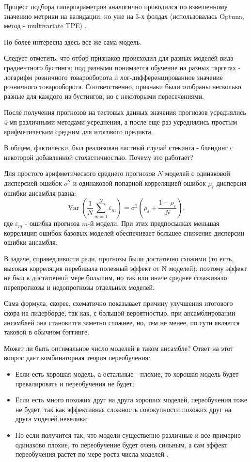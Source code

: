 \documentclass[12pt, a4paper]{article}
\begin{document}
Процесс подбора гиперпараметров аналогично проводился по взвешенному значению метрики на валидации,
но уже на 3-х фолдах (использовалась Optuna, метод - multivariate TPE) \cite{akiba2019, bergstra2011}.

Но более интересна здесь все же сама модель.

Следует отметить, что отбор признаков происходил для разных моделей вида градиентного бустинга;
под разными понимается обучение на разных таргетах - логарифм розничного товарооборота и лог-дифференцированное значение розничного товарооборота.
Соответственно, признаки были отобраны несколько разные для каждого из бустингов, но с некоторыми пересечениями.

После получения прогнозов на тестовых данных значения прогнозов усреднялись 4-мя различными методами усреднения, а после еще раз усреднялись
простым арифметическим средним для итогового предикта.

В общем, фактически, был реализован частный случай стекинга - блендинг с некоторой добавленной стохастичностью. Почему это работает?

Для простого арифметического среднего прогнозов $N$ моделей с одинаковой дисперсией ошибок
$\sigma^2$ и одинаковой попарной корреляцией ошибок $\rho_{\varepsilon}$ дисперсия ошибки
ансамбля равна:
\[
\operatorname{Var}\left(\frac{1}{N}\sum_{m=1}^{N}\varepsilon_m\right)
= \sigma^2\left(\rho_{\varepsilon} + \frac{1-\rho_{\varepsilon}}{N}\right),
\]
где $\varepsilon_m$ - ошибка прогноза $m$-й модели. При этих предпосылках меньшая корреляция
ошибок базовых моделей обеспечивает большее снижение дисперсии ошибки ансамбля.

В задаче, справедливости ради, прогнозы были достаточно схожими
(то есть, высокая корреляция перебивала полезный эффект от N моделей), поэтому эффект не был в достаточной мере большим,
но так или иначе среднее сглаживало перепрогнозы и недопрогнозы отдельных моделей.

Сама формула, скорее, схематично показывает причину улучшения итогового скора на лидерборде, так как,
с большой вероятностью, при ансамблировании ансамблей она становится заметно сложнее, но, тем не менее, по сути является таковой в обычном бэггинге.

Может ли быть оптимальное число моделей в таком ансамбле? Ответ на этот вопрос дает комбинаторная теория переобучения:

\begin{itemize}\item Если есть хорошая модель, а остальные - плохие, то хорошая модель будет превалировать и переобучения не будет;

\item Если есть много похожих друг на друга хороших моделей, переобучения тоже не будет, так как эффективная сложность
совокупности похожих друг на друга моделей невелика;

\item Но если получится так, что модели существенно различные и
все примерно одинаково плохие, то переобучение будет очень сильным, а сам эффект переобучения растет по мере роста числа моделей \cite{vorontsov2016}.
\end{itemize}
\end{document}
